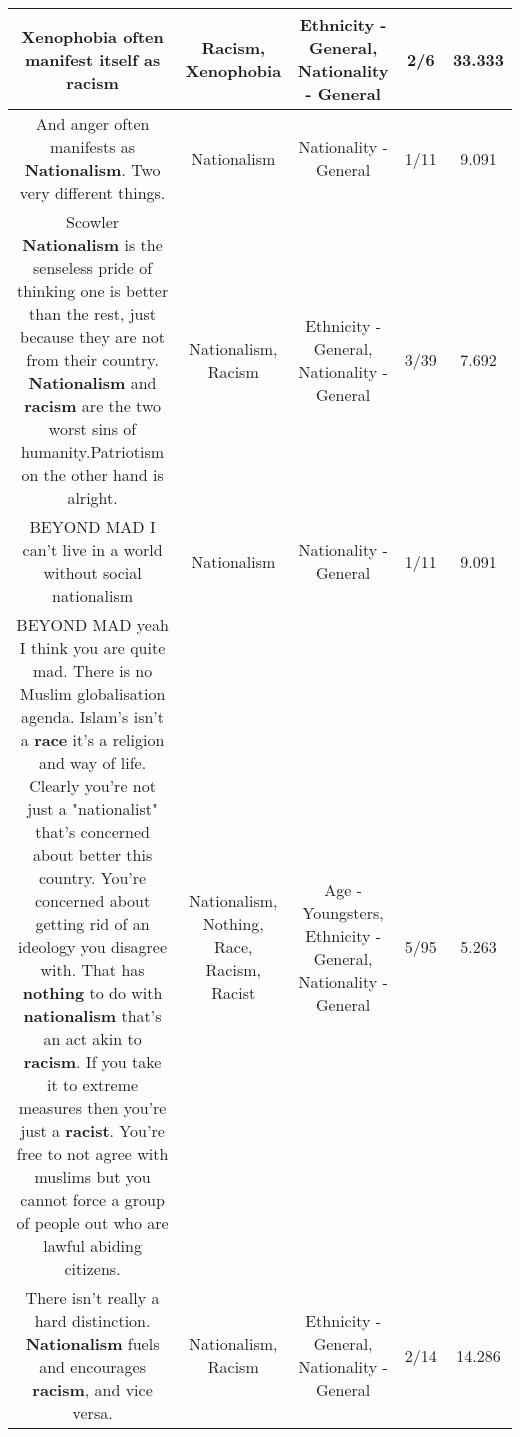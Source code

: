 \documentclass[11pt]{article}
\newlength\mylength
\begin{document}
\begin{center}
\begin{longtable}{|C{.65\mylength}|C{.30\mylength}|C{.12\mylength}|C{.12\mylength}|C{.12\mylength}|}
  \small Xenophobia often manifest itself as racism\normalsize   & Racism, Xenophobia & Ethnicity - General, Nationality - General & 2/6 & 33.333 \\  \hline
  \small {} And anger often manifests as \textbf{Nationalism}. Two very different things.\normalsize   & Nationalism & Nationality - General & 1/11 & 9.091 \\  \hline
  \small Scowler \textbf{Nationalism} is the senseless pride of thinking one is better than the rest, just because they are not from their country. \textbf{Nationalism} and \textbf{racism} are the two worst sins of humanity.Patriotism on the other hand is alright.\normalsize   & Nationalism, Racism & Ethnicity - General, Nationality - General & 3/39 & 7.692 \\  \hline
  \small BEYOND MAD I can't live in a world without social nationalism\normalsize   & Nationalism & Nationality - General & 1/11 & 9.091 \\  \hline
  \small BEYOND MAD yeah I think you are quite mad. There is no Muslim globalisation agenda. Islam's isn't a \textbf{race} it's a religion and way of life. Clearly you're not just  a "nationalist" that's concerned about better this country. You're concerned about getting rid of an ideology you disagree with. That has \textbf{nothing} to do with \textbf{nationalism}  that's an act akin to \textbf{racism}. If you take it to extreme measures then you're just a \textbf{racist}. You're free to not agree with muslims but you cannot force a group of people out who are lawful abiding citizens.\normalsize   & Nationalism, Nothing, Race, Racism, Racist & Age - Youngsters, Ethnicity - General, Nationality - General & 5/95 & 5.263 \\  \hline
  \small There isn't really a hard distinction. \textbf{Nationalism} fuels and encourages \textbf{racism}, and vice versa.\normalsize   & Nationalism, Racism & Ethnicity - General, Nationality - General & 2/14 & 14.286 \\  \hline

\end{longtable}
\end{center}
\end{document}
